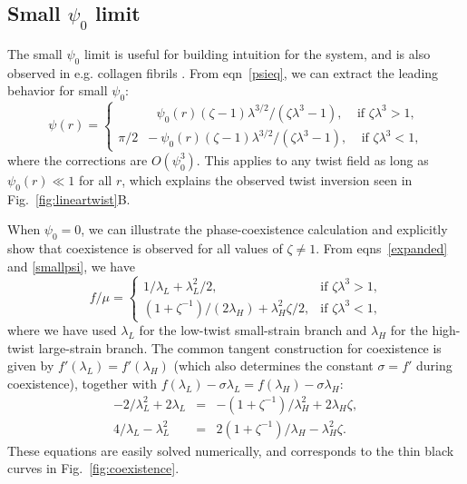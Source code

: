 \documentclass[twoside,twocolumn,9pt]{article}
\begin{document}
\subsection{Small $\psi_0$ limit}
The small $\psi_0$ limit is useful for building intuition for the system, and is also observed in e.g. collagen fibrils \cite{Leighton:2021a, Leighton:2021b}. From eqn~\eqref{psieq}, we can extract the leading behavior for small $\psi_0$:
\begin{equation}\label{smallpsi}
\psi(r) = \begin{cases}
    &\ \ \ \psi_0(r) (\zeta-1) \lambda^{3/2}/\left(\zeta\lambda^3 -1 \right),\ \ \ \ \ \text{if $\zeta \lambda^3 >1$,} \\
        \pi/2&-\ \psi_0(r) (\zeta-1) \lambda^{3/2}/\left(\zeta\lambda^3 -1 \right),\ \ \ \ \ \text{if $\zeta \lambda^3 <1$,}
        \end{cases}
\end{equation}
where the corrections are $O(\psi_0^3)$.
This applies to any twist field as long as $\psi_0(r) \ll 1$ for all $r$, which explains the observed twist inversion seen in Fig.~\ref{fig:lineartwist}B. 

When $\psi_0=0$, we can illustrate the phase-coexistence calculation and explicitly show that coexistence is observed for all values of $\zeta \neq 1$. From eqns~\eqref{expanded} and \eqref{smallpsi}, we have
\begin{equation}\label{fcases}
f/\mu = \begin{cases}
     1/\lambda_L+\lambda_L^2/2, & \text{if $\zeta \lambda^3 >1$,} \\
      (1+\zeta^{-1})/(2 \lambda_H) + \lambda_H^2 \zeta/2,& \text{if $\zeta \lambda^3 <1$,}
        \end{cases}
\end{equation}
where we have used $\lambda_L$ for the low-twist small-strain branch and $\lambda_H$ for the high-twist large-strain branch. The common tangent construction for coexistence is given by $f'(\lambda_L) = f'(\lambda_H)$ (which also determines the constant $\sigma=f'$ during coexistence), together with $f(\lambda_L) - \sigma \lambda_L=f(\lambda_H) - \sigma \lambda_H$:
\begin{eqnarray}\label{smallcoexist}
-2/\lambda_L^2 +2 \lambda_L & =& -(1+\zeta^{-1})/\lambda_H^2 + 2 \lambda_H \zeta, \nonumber \\
4/\lambda_L - \lambda_L^2 & =& 2(1+\zeta^{-1})/\lambda_H - \lambda_H^2 \zeta.
\end{eqnarray}
These equations are easily solved numerically, and corresponds to the thin black curves in Fig.~\ref{fig:coexistence}. 
\end{document}

